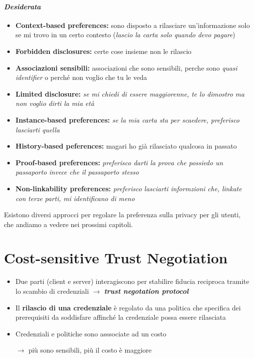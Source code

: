 \documentclass{report}
\begin{document}
\subsubsection{\textit{Desiderata}}
\begin{itemize}
    \item \textbf{Context-based preferences:} sono disposto a rilasciare un'informazione solo se mi trovo in un certo contesto (\textit{lascio la carta solo quando devo pagare})
    \item \textbf{Forbidden disclosures:} certe cose insieme non le rilascio
    \item \textbf{Associazioni sensibili:} associazioni che sono sensibili, perche sono \textit{quasi identifier} o perché non voglio che tu le veda
    \item \textbf{Limited disclosure:} \textit{se mi chiedi di essere maggiorenne, te lo dimostro ma non voglio dirti la mia età}
    \item \textbf{Instance-based preferences:} \textit{se la mia carta sta per scaedere, preferisco lasciarti quella}
    \item \textbf{History-based peferences:} magari ho già rilasciato qualcosa in passato
    \item \textbf{Proof-based preferences:} \textit{preferisco darti la prova che possiedo un passaporto invece che il passaporto stesso}
    \item \textbf{Non-linkability preferences:} \textit{preferisco lasciarti informzioni che, linkate con terze parti, mi identificano di meno}
\end{itemize}

\noindent Esistono diversi approcci per regolare la preferenza sulla privacy per gli utenti, 
che andiamo a vedere nei prossimi capitoli.

\chapter{Cost-sensitive Trust Negotiation}

\begin{itemize}
    \item Due parti (client e server) interagiscono per stabilire fiducia reciproca tramite lo scambio di credenziali 
    $\rightarrow$ \textbf{\textit{trust negotation protocol}}
    \item Il \textbf{rilascio di una credenziale} è regolato da una politica che specifica dei prerequisiti da soddisfare 
    affinché la credenziale possa essere rilasciata
    \item Credenziali e politiche sono asssociate ad un costo 

    $\rightarrow$ più sono sensibili, più il costo è maggiore 
\end{itemize}
\end{document}
